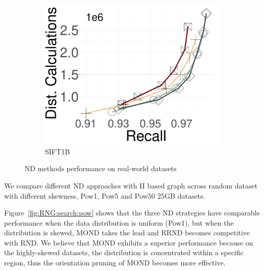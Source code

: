 \begin{figure}[h!]
\begin{subfigure}{0.28\columnwidth}
		      \label{fig:ND:sift100GB}
		\end{subfigure}	
  \hspace{0.5cm}
		\begin{subfigure}{0.28\columnwidth}
			\centering
			\captionsetup{justification=centering}	
			\includegraphics[width=\textwidth]{../img/Experiments/RNG/DC_SIFT1B.pdf}
   \caption{{SIFT1B}}
		\label{fig:ND:sift1b}
		\end{subfigure}	
		\caption{{ND methods performance on real-world datasets}}
		\label{fig:ND:search:real}
 \end{figure}

We compare different ND approaches with II based graph across random dataset with different skewness, Pow1, Pow5 and Pow50 25GB datasets. 

   Figure~\ref{fig:RNG:search:pow} shows that the three ND strategies have comparable performance when the data distribution is uniform (Pow1), but when the distribution is skewed, MOND takes the lead and RRND becomes competitive with RND. We believe that MOND exhibits a superior performance because on the highly-skewed datasets, the distribution is concentrated within a specific region, thus the orientation pruning of MOND becomes more effective.


